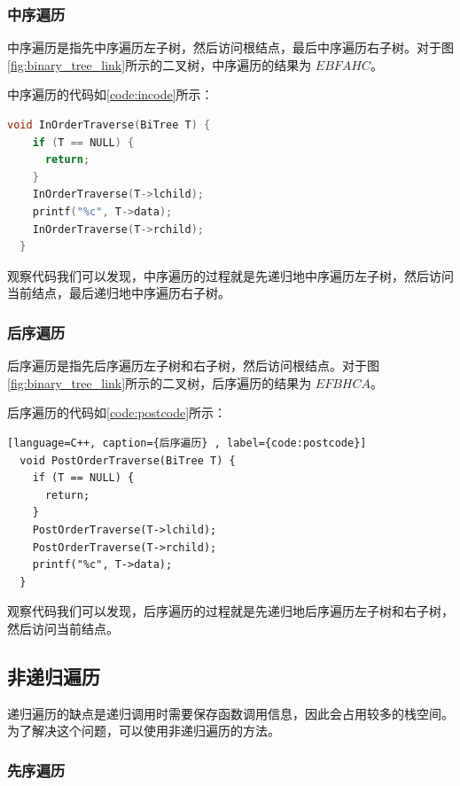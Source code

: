 \documentclass[lang=cn,newtx,10pt,scheme=chinese]{../elegantbook}
\begin{document}
\subsubsection{中序遍历}

中序遍历是指先中序遍历左子树，然后访问根结点，最后中序遍历右子树。对于图\ref{fig:binary_tree_link}所示的二叉树，中序遍历的结果为 $EBFAHC$。

中序遍历的代码如\ref{code:incode}所示：

\begin{lstlisting}[language=C++, caption={中序遍历}, label={code:incode}]
  void InOrderTraverse(BiTree T) {
    if (T == NULL) {
      return;
    }
    InOrderTraverse(T->lchild);
    printf("%c", T->data);
    InOrderTraverse(T->rchild);
  }

\end{lstlisting}

观察代码我们可以发现，中序遍历的过程就是先递归地中序遍历左子树，然后访问当前结点，最后递归地中序遍历右子树。
\subsubsection{后序遍历}


后序遍历是指先后序遍历左子树和右子树，然后访问根结点。对于图\ref{fig:binary_tree_link}所示的二叉树，后序遍历的结果为 $EFBHCA$。

后序遍历的代码如\ref{code:postcode}所示：

\begin{lstlisting}[language=C++, caption={后序遍历} , label={code:postcode}]
  void PostOrderTraverse(BiTree T) {
    if (T == NULL) {
      return;
    }
    PostOrderTraverse(T->lchild);
    PostOrderTraverse(T->rchild);
    printf("%c", T->data);
  }

\end{lstlisting}

观察代码我们可以发现，后序遍历的过程就是先递归地后序遍历左子树和右子树，然后访问当前结点。
\subsection{非递归遍历}

递归遍历的缺点是递归调用时需要保存函数调用信息，因此会占用较多的栈空间。为了解决这个问题，可以使用非递归遍历的方法。


\subsubsection{先序遍历}
\end{document}
